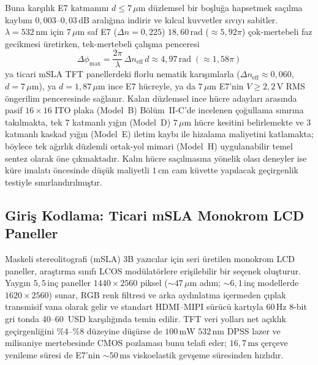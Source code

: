 \documentclass[journal]{IEEEtran}
\begin{document}
Buna kar\c{s}\i{}l\i{}k E7 katman\i{}n\i{} $d \le 7\,\mu\text{m}$ d\"uzlemsel bir bo\c{s}lu\u{g}a hapsetmek sa\c{c}\i{}lma kayb\i{}n\i{} $0{,}003\text{--}0{,}03\,\text{dB}$ aral\i{}\u{g}\i{}na indirir ve k\i{}lcal kuvvetler s\i{}v\i{}y\i{} sabitler. $\lambda = 532\,\text{nm}$ i\c{c}in $7\,\mu\text{m}$ saf E7 ($\Delta n = 0{,}225$) $18{,}60\,\text{rad}$ ($\approx 5{,}92\pi$) \c{c}ok-mertebeli faz gecikmesi \"uretirken, tek-mertebeli \c{c}al\i{}\c{s}ma penceresi
\begin{equation}
  \Delta\phi_{\max} = \frac{2\pi}{\lambda}\,\Delta n_{\mathrm{eff}}\, d \approx 4{,}97\,\text{rad} \; (\approx 1{,}58\pi)
  \label{eq:max_phase}
\end{equation}
ya ticari mSLA TFT panellerdeki florlu nematik kar\i{}\c{s}\i{}mlarla ($\Delta n_{\mathrm{eff}} \approx 0{,}060$, $d = 7\,\mu\text{m}$), ya $d = 1{,}87\,\mu\text{m}$ ince E7 h\"ucreyle, ya da $7\,\mu\text{m}$ E7'nin $V \ge 2{,}2\,\text{V}$ RMS \"ongerilim penceresinde sa\u{g}lan\i{}r. Kalan d\"uzlemsel ince h\"ucre adaylar\i{} aras\i{}nda pasif $16\times 16$ ITO plaka (Model~B) B\"ol\"um~II-C'de incelenen \c{c}o\u{g}ullama s\i{}n\i{}r\i{}na tak\i{}lmakta, tek 7 katmanl\i{} y\i{}\u{g}\i{}n (Model~D) $7\,\mu\text{m}$ h\"ucre kesitini belirlemekte ve 3 katmanl\i{} kaskad y\i{}\u{g}\i{}n (Model~E) iletim kayb\i{} ile hizalama maliyetini katlamakta; b\"oylece tek a\u{g}\i{}rl\i{}k d\"uzlemli ortak-yol mimari (Model~H) uygulanabilir temel sentez olarak \"one \c{c}\i{}kmaktad\i{}r. Kal\i{}n h\"ucre sa\c{c}\i{}lmas\i{}na y\"onelik olas\i{} deneyler ise k\"ure imalat\i{} \"oncesinde d\"u\c{s}\"uk maliyetli $1\,\text{cm}$ cam k\"uvette yap\i{}lacak ge\c{c}irgenlik testiyle s\i{}n\i{}rland\i{}r\i{}lm\i{}\c{s}t\i{}r.

\subsection{Giri\c{s} Kodlama: Ticari mSLA Monokrom LCD Paneller}
Maskeli stereolitografi (mSLA) 3B yaz\i{}c\i{}lar i\c{c}in seri \"uretilen monokrom LCD paneller, ara\c{s}t\i{}rma s\i{}n\i{}f\i{} LCOS mod\"ulat\"orlere eri\c{s}ilebilir bir se\c{c}enek olu\c{s}turur. Yayg\i{}n $5{,}5\,\text{in\c{c}}$ paneller $1440\times 2560$ piksel ($\sim 47\,\mu\text{m}$ ad\i{}m; $\sim 6{,}1\,\text{in\c{c}}$ modellerde $1620\times 2560$) sunar, RGB renk filtresi ve arka ayd\i{}nlatma i\c{c}ermeden \c{c}\i{}plak transmisif vana olarak gelir ve standart HDMI--MIPI s\"ur\"uc\"u kart\i{}yla $60\,\text{Hz}$ 8-bit gri tonda 40--60~USD kar\c{s}\i{}l\i{}\u{g}\i{}nda temin edilir. TFT veri yollar\i{} net a\c{c}\i{}kl\i{}k ge\c{c}irgenli\u{g}ini \%4--\%8 d\"uzeyine d\"u\c{s}\"urse de $100\,\text{mW}$ $532\,\text{nm}$ DPSS lazer ve milisaniye mertebesinde CMOS pozlamas\i{} bunu telafi eder; $16{,}7\,\text{ms}$ \c{c}er\c{c}eve yenileme s\"uresi de E7'nin $\sim 50\,\text{ms}$ viskoelastik gev\c{s}eme s\"uresinden h\i{}zl\i{}d\i{}r.
\end{document}
